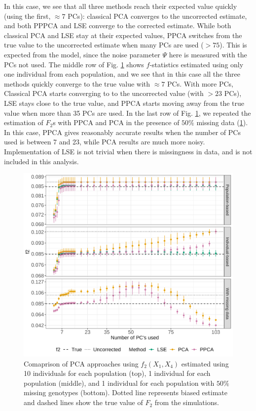 \documentclass[12pt, letterpaper]{article}
\begin{document}
In this case, we see that all three methods reach their expected value quickly (using the first, $\approx 7$ PCs): classical PCA converges to the uncorrected estimate, and both PPPCA and LSE converge to the corrected estimate. While both classical PCA and LSE stay at their expected values, PPCA switches from the true value to the uncorrected estimate when many PCs are used ($>75$). This is expected from the model, since the noise parameter $\Psi$ here is measured with the PCs not used. The middle row of Fig. \ref{fig:comparison} shows $f$-statistics estimated using only one individual from each population, and we see that in this case all the three methods quickly converge to the true value with $\approx 7$ PCs. With more PCs, Classical PCA starts converging to to the uncorrected value (with $>23$ PCs), LSE stays close to the true value, and PPCA starts moving away from the true value when more than 35 PCs are used. In the last row of Fig. \ref{fig:comparison}, we repeated the estimation of $F_2$s with PPCA and PCA in the presence of $50\%$ missing data (\ref{fig:comparison}). In this case, PPCA gives reasonably accurate results when the number of PCs used is between 7 and 23, while PCA results are much more noisy. Implementation of LSE is not trivial when there is missingness in data, and is not included in this analysis. 


\begin{figure}[ht!]
    \includegraphics[width=16.5cm]{plots/simfiles_Ne1000_split_times1000/npop10_nind100/missing0.5/mu0.05_main_fig_all_pca.png}
    \centering
    \caption{Comaprison of PCA approaches using $f_2(X_1,X_4)$ estimated using 10 individuals for each population (top), 1 individual for each population (middle), and 1 individual for each population with $50\%$ missing genotypes (bottom). Dotted line represents biased estimate and dashed lines show the true value of $F_2$ from the simulations.}
    \label{fig:comparison}
\end{figure}
\end{document}
